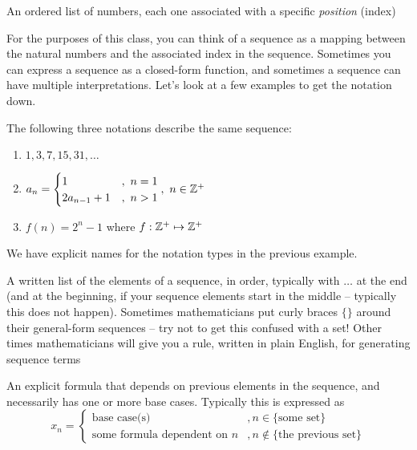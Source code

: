 \documentclass[main.tex]{subfiles}
\begin{document}
\begin{defn}
	An ordered list of numbers, each one associated with a specific \textit{position} (index)
\end{defn}

For the purposes of this class, you can think of a sequence as a mapping between the natural numbers and the associated index in the sequence. Sometimes you can express a sequence as a closed-form function, and sometimes a sequence can have multiple interpretations. Let's look at a few examples to get the notation down.

\begin{example}
	The following three notations describe the same sequence:
	
	\begin{enumerate}[label=(\alph*)]
		\item \(1, 3, 7, 15, 31, \dots\)
		\item \(a_n = \begin{cases} 1 &,\ n = 1 \\ 2a_{n-1} + 1 &,\ n > 1 \end{cases},\ n \in \mathbb{Z}^+\)
		\item \(f(n) = 2^n - 1\) where \(f : \mathbb{Z}^+ \mapsto \mathbb{Z}^+\)
	\end{enumerate}
\end{example}

We have explicit names for the notation types in the previous example.

\begin{defn}
	A written list of the elements of a sequence, in order, typically with \(\dots\) at the end (and at the beginning, if your sequence elements start in the middle -- typically this does not happen). Sometimes mathematicians put curly braces \(\{\}\) around their general-form sequences -- try not to get this confused with a set! Other times mathematicians will give you a rule, written in plain English, for generating sequence terms
\end{defn}

\begin{defn}
	An explicit formula that depends on previous elements in the sequence, and necessarily has one or more base cases. Typically this is expressed as \[x_n = \begin{cases} \text{base case(s)} &, n \in \{\text{some set}\} \\ \text{some formula dependent on } n &, n \not\in \{\text{the previous set}\} \end{cases}\]
\end{defn}
\end{document}
